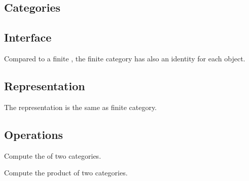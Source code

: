 
\subsection{Categories}
\subsection*{Interface}
Compared to a finite , the finite category has also an identity for each object.


\subsection*{Representation}

The representation is the same as finite category.

\subsection*{Operations}

\begin{codeexercise}
    Compute the  of two categories.

\end{codeexercise}

\begin{codeexercise}
    Compute the product of two categories.

\end{codeexercise}

